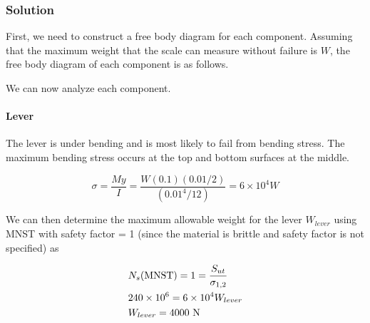 \documentclass[
10pt,
a4paper,
openany,
svgnames,
]{book}
\begin{document}
\subsubsection{Solution}

First, we need to construct a free body diagram for each component. Assuming that the maximum weight that the scale can measure without failure is $W$, the free body diagram of each component is as follows.

\begin{figure}
  \centering
\end{figure}

We can now analyze each component.

\paragraph{Lever}

The lever is under bending and is most likely to fail from bending stress. The maximum bending stress occurs at the top and bottom surfaces at the middle.

\[\sigma  = \frac{My}{I} = \frac{W(0.1)(0.01/2)}{(0.01^4/12)} = 6 \times
  10^4W\]

We can then determine the maximum allowable weight for the lever $W_{lever}$ using MNST with safety factor = 1 (since the material is brittle and safety factor is not specified) as

\[\begin{gathered}
  N_s\text{(MNST)} = 1 = \frac{S_{ut}}{\sigma _{1,2}} \hfill \\
  240 \times {10^6} = 6 \times 10^4W_{lever} \hfill \\
  W_{lever} = 4000\text{ N} \hfill \\ 
\end{gathered} \]
\end{document}
